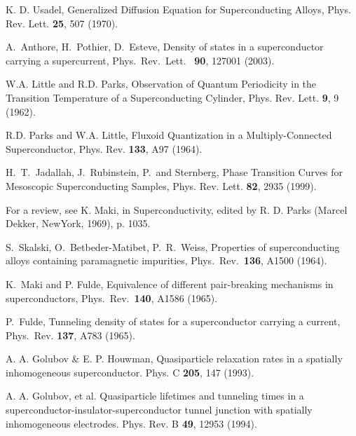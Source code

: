 \documentclass[prx,twocolumn,aps,superscriptaddress,showpacs,amsmath,amssymb,footnoteinbib]{revtex4-1}
\begin{document}
\begin{thebibliography}{99}
K. D. Usadel, Generalized Diffusion Equation for Superconducting
Alloys, Phys. Rev. Lett. {\bf 25}, 507 (1970).

A.\ Anthore, H.\ Pothier, D.\ Esteve, Density of states in a
superconductor carrying a supercurrent, Phys.\ Rev.\ Lett.\ {\bf
90}, 127001 (2003).

W.A. Little and R.D. Parks, Observation of Quantum Periodicity in
the Transition Temperature of a Superconducting Cylinder, Phys.
Rev. Lett. {\bf 9}, 9 (1962).

R.D. Parks and W.A. Little, Fluxoid Quantization in a
Multiply-Connected Superconductor, Phys. Rev. {\bf 133}, A97
(1964).

H.\ T.\ Jadallah, J.\ Rubinstein, P.\ and Sternberg, Phase
Transition Curves for Mesoscopic Superconducting Samples, Phys.
Rev. Lett. {\bf 82}, 2935 (1999).

For a review, see K. Maki, in Superconductivity, edited by R. D.
Parks (Marcel Dekker, NewYork, 1969), p. 1035.

 S.\ Skalski, O.\ Betbeder-Matibet, P.\ R.\ Weiss,
Properties of superconducting alloys containing paramagnetic
impurities, Phys.\ Rev.\ {\bf 136}, A1500 (1964).

 K.\ Maki and P. Fulde,
Equivalence of different pair-breaking mechanisms in
superconductors,
 Phys.\ Rev.\ {\bf 140}, A1586 (1965).

P.\ Fulde, Tunneling density of states for a superconductor
carrying a current, Phys.\ Rev. {\bf 137}, A783 (1965).

A. A. Golubov \&  E. P. Houwman, Quasiparticle relaxation rates in
a spatially inhomogeneous superconductor. Phys. C \textbf{205},
147 (1993). %

A. A. Golubov, et al. Quasiparticle lifetimes and tunneling times
in a superconductor-insulator-superconductor tunnel junction with
spatially inhomogeneous electrodes. Phys. Rev. B \textbf{49},
12953 (1994).




\end{thebibliography}
\end{document}
